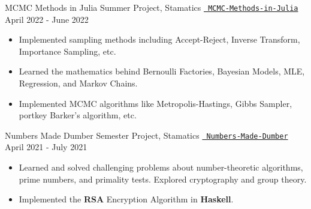   \cventry
  {MCMC Methods in Julia}
  {Summer Project, Stamatics}
  {\texttt{\href{https://github.com/abhishekshree/mcmc-methods-in-julia}{\faGithub{} MCMC-Methods-in-Julia}}}
  {April 2022 - June 2022}
  {
    \begin{itemize}
      \item Implemented sampling methods including Accept-Reject, Inverse Transform, Importance Sampling, etc.
      \item Learned the mathematics behind Bernoulli Factories, Bayesian Models, MLE, Regression, and Markov Chains.
      \item Implemented MCMC algorithms like Metropolis-Hastings, Gibbs Sampler, portkey Barker’s algorithm, etc.
    \end{itemize}
  }
  \cventry
  {Numbers Made Dumber}
  {Semester Project, Stamatics}
  {\texttt{\href{https://github.com/abhishekshree/Numbers-Made-Dumber}{\faGithub{} Numbers-Made-Dumber}}}
  {April 2021 - July 2021}
  {
    \begin{itemize}
      \item Learned and solved challenging problems about number-theoretic algorithms, prime numbers, and primality tests. Explored cryptography and group theory. 
      \item Implemented the \textbf{RSA} Encryption Algorithm in \textbf{Haskell}.
    \end{itemize}
  }
\vspace{-2mm}

